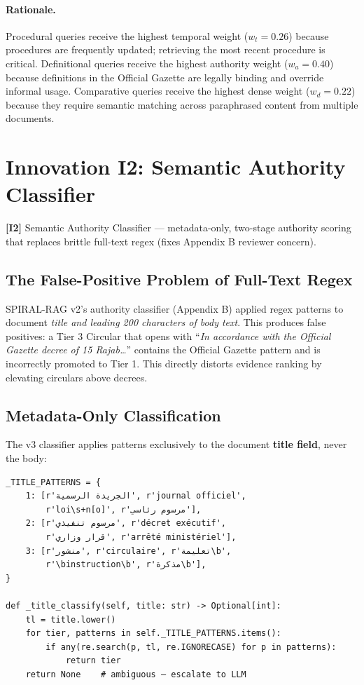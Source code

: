 \documentclass[12pt,a4paper]{article}
\newcommand{\innov}[2]{%
  \vspace{4pt}
  \noindent\colorbox{innovcolor!10}{\parbox{\dimexpr\linewidth-2\fboxsep}{%
    \small\textbf{\color{innovcolor}[I#1]} #2}}\vspace{4pt}}
\begin{document}
\paragraph{Rationale.} Procedural queries receive the highest temporal weight
($w_t=0.26$) because procedures are frequently updated; retrieving the most
recent procedure is critical. Definitional queries receive the highest authority
weight ($w_a=0.40$) because definitions in the Official Gazette are legally
binding and override informal usage. Comparative queries receive the highest
dense weight ($w_d=0.22$) because they require semantic matching across
paraphrased content from multiple documents.

\section{Innovation I2: Semantic Authority Classifier}
\label{sec:authority_cls}

\innov{2}{Semantic Authority Classifier — metadata-only, two-stage authority
scoring that replaces brittle full-text regex (fixes Appendix B reviewer concern).}

\subsection{The False-Positive Problem of Full-Text Regex}

SPIRAL-RAG v2's authority classifier (Appendix B) applied regex patterns to
document \emph{title and leading 200 characters of body text}. This produces
false positives: a Tier 3 Circular that opens with ``\textit{In accordance with
the Official Gazette decree of 15 Rajab\ldots}'' contains the Official Gazette
pattern and is incorrectly promoted to Tier 1. This directly distorts evidence
ranking by elevating circulars above decrees.

\subsection{Metadata-Only Classification}

The v3 classifier applies patterns exclusively to the document \textbf{title field},
never the body:

\begin{lstlisting}[style=pythonstyle,caption={Title-only authority classification.}]
_TITLE_PATTERNS = {
    1: [r'الجريدة الرسمية', r'journal officiel',
        r'loi\s+n[o]', r'مرسوم رئاسي'],
    2: [r'مرسوم تنفيذي', r'décret exécutif',
        r'قرار وزاري', r'arrêté ministériel'],
    3: [r'منشور', r'circulaire', r'تعليمة\b',
        r'\binstruction\b', r'مذكرة\b'],
}

def _title_classify(self, title: str) -> Optional[int]:
    tl = title.lower()
    for tier, patterns in self._TITLE_PATTERNS.items():
        if any(re.search(p, tl, re.IGNORECASE) for p in patterns):
            return tier
    return None    # ambiguous — escalate to LLM
\end{lstlisting}
\end{document}
